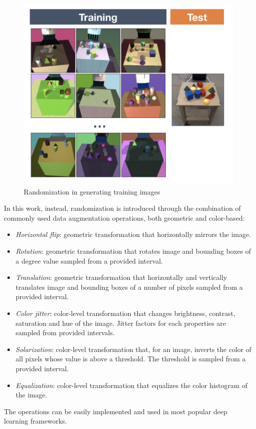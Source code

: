 \documentclass[%
    corpo=12pt,
    twoside,
    stile=classica,   
    tipotesi=magistrale,
    evenboxes,
    english,
	numerazioneromana,
]{toptesi}
\begin{document}
\begin{figure}[ht!]
	\centering
	\includegraphics[width=0.8\linewidth]{imgs/randomization.png}
	\caption{Randomization in generating training images\cite{tobin2017domain}}
	\label{fig:randomization}
\end{figure}

In this work, instead, randomization is introduced through the combination of commonly used data augmentation operations, both geometric and color-based:
\begin{itemize}
	\item \textit{Horizontal flip}: geometric transformation that horizontally mirrors the image.
	\item \textit{Rotation}: geometric transformation that rotates image and bounding boxes of a degree value sampled from a provided interval.
	\item \textit{Translation}: geometric transformation that horizontally and vertically translates image and bounding boxes of a number of pixels sampled from a provided interval.
	\item \textit{Color jitter}: color-level transformation that changes brightness, contrast, saturation and hue of the image. Jitter factors for each properties are sampled from provided intervals.
	\item \textit{Solarization}: color-level transformation that, for an image, inverts the color of all pixels whose value is above a threshold. The threshold is sampled from a provided interval.
	\item \textit{Equalization}: color-level transformation that equalizes the color histogram of the image.
\end{itemize}
The operations can be easily implemented and used in most popular deep learning frameworks.
\end{document}
